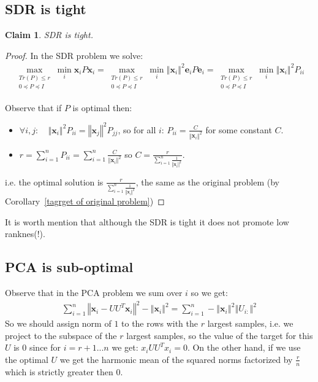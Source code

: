 \documentclass{article}
\newtheorem{claim}{Claim}
\newcommand{\cororef}[1]{Corollary~\ref{#1}}
\newcommand{\x}{{\mathbf x}}
\newcommand{\e}{{\mathbf e}}
\begin{document}
\subsection{SDR is tight}
\begin{claim} \label{SDR is tight}
SDR is tight.
\end{claim}
\begin{proof}
    In the SDR problem we solve:
    \begin{align*}
\max_{\begin{array}{c}
Tr\left(P\right)\le r\\
0\preceq P\preceq I
\end{array}}\min_{i}\x_{i}P\x_{i}=
\max_{\begin{array}{c}
Tr\left(P\right)\le r\\
0\preceq P\preceq I
\end{array}}\min_{i}\left\Vert \x_{i}\right\Vert^{2}\e_{i}P\e_{i}= 
\max_{\begin{array}{c}
Tr\left(P\right)\le r\\
0\preceq P\preceq I
\end{array}}\min_{i}\left\Vert \x_{i}\right\Vert^{2}P_{ii}
    \end{align*}
    
Observe that if $P$ is optimal then:
\begin{itemize}
    \item $\forall i,j:\quad\left\Vert\x_{i}\right\Vert^{2}P_{ii}=\left\Vert\x_{j}\right\Vert^{2}P_{jj}$, so for all $i$: $P_{ii}=\frac{C}{\left\Vert\x_{i}\right\Vert^{2}}$ for some constant $C$.
    \item $r=\sum_{i=1}^n P_{ii}=\sum_{i=1}^n\frac{C}{\left\Vert\x_{i}\right\Vert^{2}}$ so $C=\frac{r}{\sum_{i=1}^n\frac{1}{\left\Vert\x_{i}\right\Vert^{2}}}$.
\end{itemize}
i.e. the optimal solution is $\frac{r}{\sum_{i=1}^n\frac{1}{\left\Vert\x_{i}\right\Vert^{2}}}$, the same as the original problem (by \cororef{tagrget of original problem}) 

\end{proof}
It is worth mention that although the SDR is tight it does not promote low ranknes(!).

\subsection{PCA is sub-optimal}

Observe that in the PCA problem we sum over $i$ so we get:
\begin{align*}
    \sum_{i=1}^n\left\Vert\x_i-UU^T\x_i\right\Vert^2 - \left\Vert\x_{i}\right\Vert^2 =\sum_{i=1}^n-\left\Vert\x_{i}\right\Vert^2\left\Vert U_{i:}\right\Vert^2
\end{align*}
So we should assign norm of $1$ to the rows with the $r$ largest samples, i.e. we project to the subspace of the $r$ largest samples, so the value of the target for this $U$ is 0 since for $i=r+1...n$ we get: $x_iUU^Tx_i=0$. On the other hand, if we use the optimal $U$ we get the harmonic mean of the squared norms factorized by $\frac{r}{n}$ which is strictly greater then 0.
\end{document}
